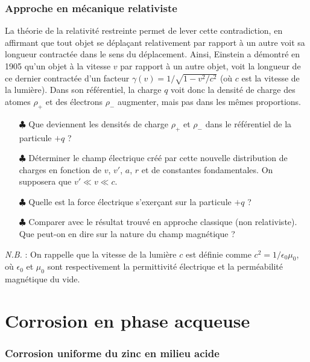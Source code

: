\documentclass{report}
\begin{document}
\subsubsection*{Approche en mécanique relativiste}

La théorie de la relativité restreinte permet de lever cette contradiction, en affirmant que tout objet se déplaçant relativement par rapport à un autre voit sa longueur contractée dans le sens du déplacement. Ainsi, Einstein a démontré en 1905 qu'un objet à la vitesse $v$ par rapport à un autre objet, voit la longueur de ce dernier contractée d'un facteur $\gamma(v)=1/\sqrt{1-v^{2}/c^{2}}$ (où $c$ est la vitesse de la lumière). Dans son référentiel, la charge $q$ voit donc la densité de charge des atomes $\rho_+$ et des électrons $\rho_-$ augmenter, mais pas dans les mêmes proportions. 
	\begin{itemize}
		\item[$\clubsuit$] Que deviennent les densités de charge $\rho_{+}$ et $\rho_{-}$ dans le référentiel de la particule $+q$ ? %
		\item[$\clubsuit$] Déterminer le champ électrique créé par cette nouvelle distribution de charges en fonction de $v$, $v'$, $a$, $r$ et de constantes fondamentales. On supposera que $v'\ll v\ll c$.
		\item[$\clubsuit$] Quelle est la force électrique s'exerçant sur la particule $+q$ ? 
		\item[$\clubsuit$] Comparer avec le résultat trouvé en approche classique (non relativiste). Que peut-on en dire sur la nature du champ magnétique ?
	\end{itemize}
			
\textit{N.B.} : On rappelle que la vitesse de la lumière $c$ est définie comme $c^{2}=1/\epsilon_{0}\mu_{0}$, où $\epsilon_{0}$ et $\mu_{0}$ sont respectivement la permittivité électrique et la perméabilité magnétique du vide.

\newpage

\section*{Corrosion en phase acqueuse}

\subsubsection*{Corrosion uniforme du zinc en milieu acide}
\end{document}
